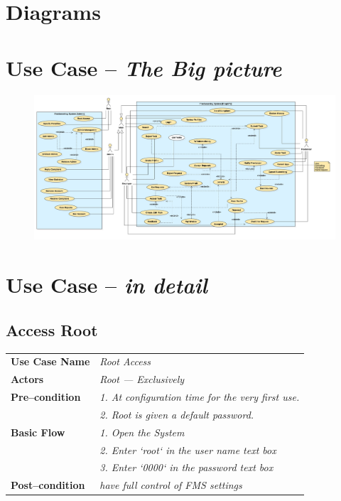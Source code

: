 \documentclass{article}
\begin{document}
\section {Diagrams}

\section{Use Case -- \textit{The Big picture}}
\begin{figure}[ht!]
\centering
\includegraphics[width=128mm]{UseCaseDiagram_Version1}
\end{figure}


\section{Use Case -- \textit{in detail}}
\subsection{Access Root}
    \begin{tabular}{ l | l }
    \toprule
      \rowcolor{LightCyan}
      \textbf{Use Case Name}    & \textit{Root Access}\\
      \textbf{Actors}           & \textit{Root --- Exclusively}\\
      \rowcolor{LightCyan}
      \textbf{Pre--condition}   & \textit{1. At configuration time for the very first use.} \\
      \rowcolor{LightCyan}
                                & \textit{2. Root is given a default password.}\\
      \textbf{Basic Flow}       & \textit{1. Open the System}\\
                                & \textit{2. Enter `root` in the user name text box}\\
                                & \textit{3. Enter `0000` in the password text box}\\
      \rowcolor{LightCyan}
      \textbf{Post--condition}  & \textit{have full control of FMS settings}\\
    \toprule
    \end{tabular}
\end{document}
